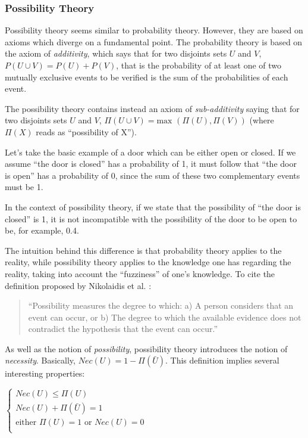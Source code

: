 \subsubsection{Possibility Theory}

Possibility theory \cite{zadeh1978fuzzy} seems similar to probability theory. However, they are based on axioms which diverge on a fundamental point.
The probability theory is based on the axiom of \emph{additivity}, which says that for two disjoints sets $U$ and $V$, $P(U \cup V) = P(U)+ P(V)$, that is the probability of at least one of two mutually exclusive events to be verified is the sum of the probabilities of each event.

The possibility theory contains instead an axiom of \emph{sub-additivity} saying that for two disjoints sets $U$ and $V$, $\Pi(U \cup V) = \text{max }(\Pi(U), \Pi(V))$ (where $\Pi(X)$ reads as \enquote{possibility of X}).

Let's take the basic example of a door which can be either open or closed. If we assume \enquote{the door is closed} has a probability of 1, it must follow that \enquote{the door is open} has a probability of 0, since the sum of these two complementary events must be 1.

In the context of possibility theory, if we state that the possibility of \enquote{the door is closed} is 1, it is not incompatible with the possibility of the door to be open to be, for example, 0.4.

The intuition behind this difference is that probability theory applies to the reality, while possibility theory applies to the knowledge one has regarding the reality, taking into account the \enquote{fuzziness} of one's knowledge. To cite the definition proposed by Nikolaidis et al. \cite{nikolaidis:386}:
\begin{quote}
\enquote{Possibility measures the degree to which: a) A person considers that an event can
occur, or b) The degree to which the available evidence does not contradict the
hypothesis that the event can occur.}
\end{quote}

As well as the notion of \emph{possibility}, possibility theory introduces the notion of \emph{necessity}. Basically, $Nec(U) = 1 - \Pi(\bar{U})$.
This definition implies several interesting properties:

$\left\{
\begin{array}{l}
Nec(U) \leq \Pi(U)\\
Nec(U) + \Pi(\bar{U}) = 1\\
\text{either } \Pi(U) = 1 \text{ or } Nec(U) = 0\\
\end{array}
\right.$
\\


